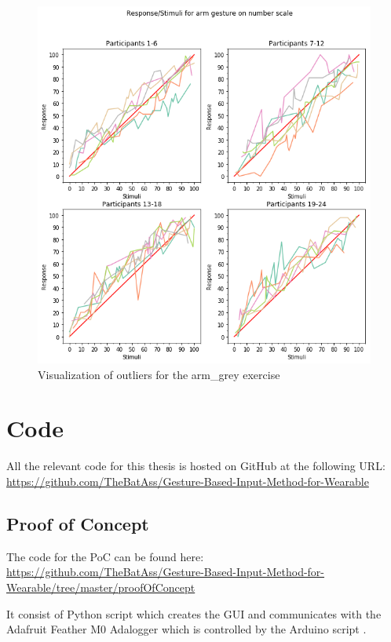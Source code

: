 \begin{figure}[h!]
\centering
\includegraphics[width=1.1\textwidth]{figures/visual_out6.png}
\caption{Visualization of outliers for the arm\_grey exercise}
\label{NAN}
\end{figure}






\chapter{Code}
All the relevant code for this thesis is hosted on GitHub at the following URL:\\
\url{https://github.com/TheBatAss/Gesture-Based-Input-Method-for-Wearable}

\section{Proof of Concept}\label{poc_code}
The code for the PoC can be found here:\\
\url{https://github.com/TheBatAss/Gesture-Based-Input-Method-for-Wearable/tree/master/proofOfConcept}

It consist of Python script  which creates the GUI and communicates with the Adafruit Feather M0 Adalogger\cite{adalogger} which is controlled by the Arduino script .

